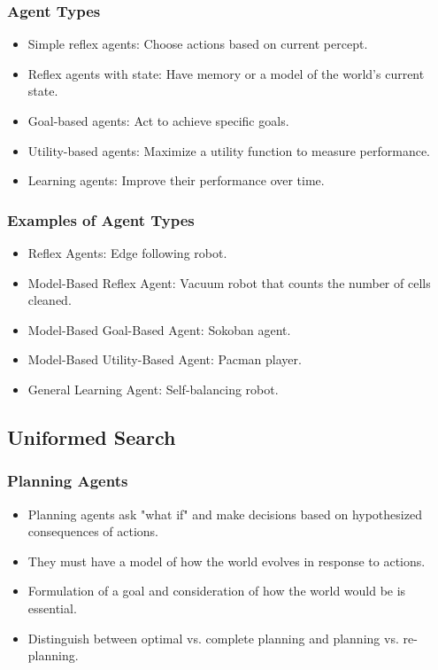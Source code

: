 \documentclass[8pt]{article}
\begin{document}
\subsubsection*{Agent Types}
\begin{itemize}
    \item Simple reflex agents: Choose actions based on current percept.
    \item Reflex agents with state: Have memory or a model of the world’s current state.
    \item Goal-based agents: Act to achieve specific goals.
    \item Utility-based agents: Maximize a utility function to measure performance.
    \item Learning agents: Improve their performance over time.
\end{itemize}

\subsubsection*{Examples of Agent Types}
\begin{itemize}
    \item Reflex Agents: Edge following robot.
    \item Model-Based Reflex Agent: Vacuum robot that counts the number of cells cleaned.
    \item Model-Based Goal-Based Agent: Sokoban agent.
    \item Model-Based Utility-Based Agent: Pacman player.
    \item General Learning Agent: Self-balancing robot.
\end{itemize}

\newpage
\subsection{Uniformed Search}
\subsubsection*{Planning Agents}
\begin{itemize}
    \item Planning agents ask "what if" and make decisions based on hypothesized consequences of actions.
    \item They must have a model of how the world evolves in response to actions.
    \item Formulation of a goal and consideration of how the world would be is essential.
    \item Distinguish between optimal vs. complete planning and planning vs. re-planning.
\end{itemize}
\end{document}
